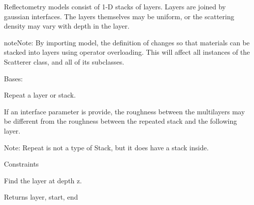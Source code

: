 \documentclass[letterpaper,10pt,english]{sphinxmanual}
\begin{document}
Reflectometry models consist of 1-D stacks of layers. Layers are joined
by gaussian interfaces. The layers themselves may be uniform, or the
scattering density may vary with depth in the layer.

\begin{notice}{note}{Note:}
By importing model, the definition of {\hyperref[api/material:refl1d.material.Scatterer]{}}
changes so that materials can be stacked into layers using operator
overloading. This will affect all instances of the Scatterer class,
and all of its subclasses.
\end{notice}

\begin{fulllineitems}
\label{api/model:refl1d.model.Repeat}
Bases: {\hyperref[api/model:refl1d.model.Layer]{}}

Repeat a layer or stack.

If an interface parameter is provide, the roughness between the
multilayers may be different from the roughness between the repeated
stack and the following layer.

Note: Repeat is not a type of Stack, but it does have a stack inside.

\begin{fulllineitems}
\label{api/model:refl1d.model.Repeat.constraints}
Constraints

\end{fulllineitems}


\begin{fulllineitems}
\label{api/model:refl1d.model.Repeat.find}
Find the layer at depth z.

Returns layer, start, end

\end{fulllineitems}


\begin{fulllineitems}
\label{api/model:refl1d.model.Repeat.magnetic}
\end{fulllineitems}


\end{fulllineitems}
\end{document}
